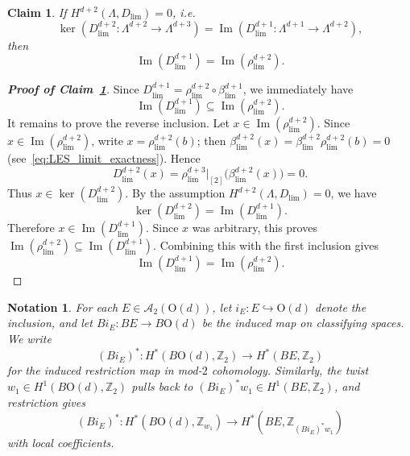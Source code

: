 \documentclass[aps,prx,reprint,superscriptaddress,twocolumn,amsmath,amssymb,amsfonts, nofootinbib]{revtex4-2}
\newcommand{\Z}{\mathbb{Z}}
\theoremstyle{apsstyle}
\newtheorem{claim}{Claim}
\newtheorem{notation}{Notation}
\begin{document}
\begin{claim}
\label{claim:acyclic_implies_imD_equal_imrho}
If $ H^{d+2}(\Lambda,D_{\lim})=0$, i.e.
\begin{equation}
\ker\left(D_{\lim}^{d+2}:\Lambda^{d+2}\to\Lambda^{d+3}\right)
= \operatorname{Im}\left(D_{\lim}^{d+1}:\Lambda^{d+1}\to\Lambda^{d+2}\right),
\end{equation}
then
\begin{equation}
\operatorname{Im}(D_{\lim}^{d+1})
= \operatorname{Im}(\rho_{\lim}^{d+2}).
\end{equation}
\end{claim}
\begin{proof}[\textnormal{\textbf{Proof of Claim~\ref{claim:acyclic_implies_imD_equal_imrho}}}]
Since $D_{\lim}^{d+1}=\rho_{\lim}^{d+2}\circ \beta_{\lim}^{d+1}$, we immediately have
\begin{equation}
\operatorname{Im}(D_{\lim}^{d+1})
\subseteq
\operatorname{Im}(\rho_{\lim}^{d+2}).
\end{equation}
It remains to prove the reverse inclusion. Let $x\in \operatorname{Im}(\rho_{\lim}^{d+2})$. 
Since $x\in\operatorname{Im}(\rho_{\lim}^{d+2})$, write $x=\rho_{\lim}^{d+2}(b)$; then $\beta_{\lim}^{d+2}(x)=\beta_{\lim}^{d+2}\rho_{\lim}^{d+2}(b)=0$ (see~\eqref{eq:LES_limit_exactness}).
Hence
\begin{equation}
D_{\lim}^{d+2}(x)
=
\rho_{\lim}^{d+3}\vert_{[2]}\bigl(\beta_{\lim}^{d+2}(x)\bigr)
=
0.
\end{equation}
Thus $x\in \ker(D_{\lim}^{d+2})$. By the assumption $H^{d+2}(\Lambda,D_{\lim})=0$, we have
\begin{equation}
\ker(D_{\lim}^{d+2})
=
\operatorname{Im}(D_{\lim}^{d+1}).
\end{equation}
Therefore $x\in \operatorname{Im}(D_{\lim}^{d+1})$. Since $x$ was arbitrary, this proves
$\operatorname{Im}(\rho_{\lim}^{d+2})\subseteq \operatorname{Im}(D_{\lim}^{d+1})$. Combining this with the first inclusion gives
\begin{equation}
\operatorname{Im}(D_{\lim}^{d+1})
=
\operatorname{Im}(\rho_{\lim}^{d+2}).
\end{equation}
\end{proof}


\bigskip 

\begin{notation}
For each $E\in \mathcal A_2(\mathrm{O}(d))$, let $i_E:E\hookrightarrow \mathrm{O}(d)$ denote the inclusion, and let $Bi_E:BE\longrightarrow B\mathrm{O}(d)$ be the induced map on classifying spaces. We write
\begin{equation}
(Bi_E)^*:H^*(B\mathrm{O}(d),\Z_2)\longrightarrow H^*(BE,\Z_2)
\end{equation}
for the induced restriction map in mod-$2$ cohomology. Similarly, the twist $w_1\in H^1(B\mathrm{O}(d),\Z_2)$ pulls back to $(Bi_E)^*w_1\in H^1(BE,\Z_2)$, and restriction gives
\begin{equation}
(Bi_E)^*:H^*(B\mathrm{O}(d),\Z_{w_1}) \longrightarrow H^*(BE,\Z_{(Bi_E)^*w_1})
\end{equation}
with local coefficients.
\end{notation}
\end{document}

